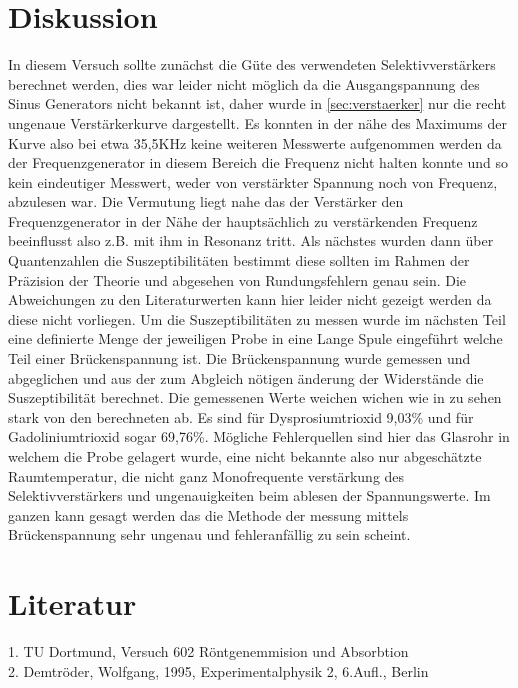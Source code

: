 \section{Diskussion} %
\label{sec:Diskussion}
In diesem Versuch sollte zunächst die Güte des verwendeten Selektivverstärkers berechnet werden,
dies war leider nicht möglich da die Ausgangspannung des Sinus Generators nicht bekannt ist, daher
wurde in \autoref{sec:verstaerker} nur die recht ungenaue Verstärkerkurve dargestellt. Es konnten
in der nähe des Maximums der Kurve also bei etwa 35,5KHz keine weiteren Messwerte aufgenommen werden
da der Frequenzgenerator in diesem Bereich die Frequenz nicht halten konnte und so kein eindeutiger 
Messwert, weder von verstärkter Spannung noch von Frequenz, abzulesen war. Die Vermutung liegt nahe das
der Verstärker den Frequenzgenerator in der Nähe der hauptsächlich zu verstärkenden Frequenz beeinflusst
also z.B. mit ihm in Resonanz tritt. Als nächstes wurden dann über Quantenzahlen die Suszeptibilitäten 
bestimmt diese sollten im Rahmen der Präzision der Theorie und abgesehen von Rundungsfehlern genau sein. Die
Abweichungen zu den Literaturwerten kann hier leider nicht gezeigt werden da diese nicht vorliegen.
Um die Suszeptibilitäten zu messen wurde im nächsten Teil eine definierte Menge 
der jeweiligen Probe in eine Lange Spule eingeführt welche Teil einer Brückenspannung
ist. Die Brückenspannung wurde gemessen und abgeglichen und aus der zum Abgleich nötigen änderung der Widerstände
die Suszeptibilität berechnet. Die gemessenen Werte weichen wichen wie in \label{tab:moseley} zu sehen stark von den berechneten ab.
Es sind für Dysprosiumtrioxid 9,03\% und für Gadoliniumtrioxid sogar 69,76\%. 
Mögliche Fehlerquellen sind hier das Glasrohr in welchem die Probe gelagert wurde,
eine nicht bekannte also nur abgeschätzte Raumtemperatur, die nicht ganz Monofrequente verstärkung des Selektivverstärkers
und ungenauigkeiten beim ablesen der Spannungswerte.
Im ganzen kann gesagt werden das die Methode der messung mittels Brückenspannung sehr ungenau und fehleranfällig zu sein scheint.
\section{Literatur}
\label{Literatur}
1. TU Dortmund, Versuch 602 Röntgenemmision und Absorbtion\\
2. Demtröder, Wolfgang, 1995, Experimentalphysik 2, 6.Aufl., Berlin\\
